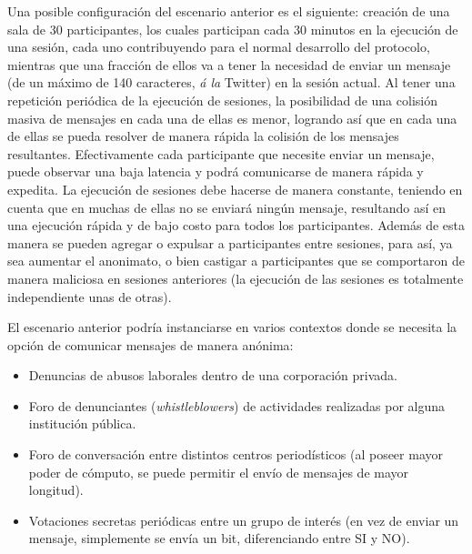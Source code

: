 Una posible configuración del escenario anterior es el siguiente: creación de 
una sala de 30 participantes, los cuales participan cada 30 minutos en la 
ejecución de una sesión, cada uno contribuyendo para el normal desarrollo del 
protocolo, mientras que una fracción de ellos va a tener la necesidad de 
enviar un mensaje (de un máximo de 140 caracteres, \emph{á la} Twitter) en la 
sesión actual. Al tener una repetición periódica de la ejecución de sesiones, 
la posibilidad de una colisión masiva de mensajes en cada una de ellas es 
menor, logrando así que en cada una de ellas se pueda resolver de manera rápida la 
colisión de los mensajes resultantes. Efectivamente cada participante que 
necesite enviar un mensaje, puede observar una baja latencia y podrá 
comunicarse de manera rápida y expedita. La ejecución de sesiones 
debe hacerse de manera constante, teniendo en cuenta que en muchas de ellas no se 
enviará ningún mensaje, resultando así en una ejecución rápida y de bajo costo 
para todos los participantes. Además de esta manera se pueden agregar o 
expulsar a participantes entre sesiones, para así, ya sea aumentar el 
anonimato, o bien castigar a participantes que se comportaron de manera 
maliciosa en sesiones anteriores (la ejecución de las sesiones es totalmente 
independiente unas de otras).

El escenario anterior podría instanciarse en varios contextos donde se 
necesita la opción de comunicar mensajes de manera anónima:
\begin{itemize}
	\item Denuncias de abusos laborales dentro de una corporación privada.
	\item Foro de denunciantes (\emph{whistleblowers}) de actividades 
	realizadas por alguna institución pública.
	\item Foro de conversación entre distintos centros periodísticos (al 
	poseer mayor poder de cómputo, se puede permitir el envío de mensajes de 
	mayor longitud).
	\item Votaciones secretas periódicas entre un grupo de interés (en vez de 
	enviar un mensaje, 
	simplemente se envía un bit, diferenciando entre SI y NO).
\end{itemize} 